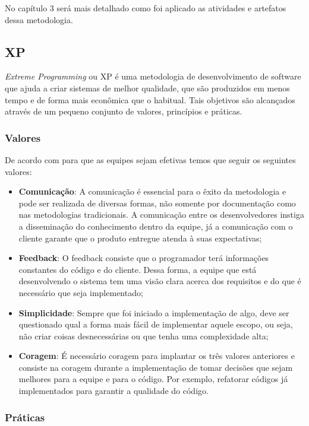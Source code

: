 No capítulo 3 será mais detalhado como foi aplicado as atividades e artefatos dessa metodologia.

\subsection{XP}

\textit{Extreme Programming} ou XP é uma metodologia de desenvolvimento de software que ajuda a criar sistemas de melhor qualidade, que são produzidos em menos tempo e de forma mais econômica que o habitual. Tais objetivos são alcançados através de um pequeno conjunto de valores, princípios e práticas. \cite{beck}

\subsubsection{Valores}

De acordo com \cite{beck} para que as equipes sejam efetivas temos que seguir os seguintes valores:

\begin{itemize}
  \item \textbf{Comunicação}: A comunicação é essencial para o êxito da metodologia e pode ser realizada de diversas formas, não somente por documentação como nas metodologias tradicionais. A comunicação entre os desenvolvedores instiga a disseminação do conhecimento dentro da equipe, já a comunicação com o cliente garante que o produto entregue atenda à suas expectativas;
  \item \textbf{Feedback}: O feedback consiste que o programador terá informações constantes do código e do cliente.  Dessa forma, a equipe que está desenvolvendo o sistema tem uma visão clara acerca dos requisitos e do que é necessário que seja implementado;
  \item \textbf{Simplicidade}: Sempre que foi iniciado a implementação de algo, deve ser questionado qual a forma mais fácil de implementar aquele escopo, ou seja, não criar coisas desnecessárias ou que tenha uma complexidade alta;
  \item \textbf{Coragem}: É necessário coragem para implantar os três valores anteriores e consiste na coragem durante a implementação de tomar decisões que sejam melhores para a equipe e para o código. Por exemplo, refatorar códigos já implementados para garantir a qualidade do código.
\end{itemize}

\subsubsection{Práticas}

